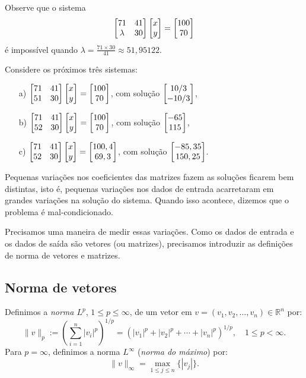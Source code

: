 \begin{ex} Observe que o sistema
\begin{equation}
\begin{bmatrix} 71&41\\\lambda&30 \end{bmatrix}\begin{bmatrix} x \\y \end{bmatrix}=\begin{bmatrix} 100 \\70 \end{bmatrix}
\end{equation}
é impossível quando $\lambda= \frac{71\times 30}{41}\approx 51,95122$.

Considere os próximos três sistemas:
\begin{enumerate}
 \item [a)] $\begin{bmatrix} 71&41\\51&30 \end{bmatrix}\begin{bmatrix} x \\y \end{bmatrix}=\begin{bmatrix} 100 \\70 \end{bmatrix}$, com solução $\begin{bmatrix} 10/3 \\-10/3 \end{bmatrix}$,
 \item [b)] $\begin{bmatrix} 71&41\\52&30 \end{bmatrix}\begin{bmatrix} x \\y \end{bmatrix}=\begin{bmatrix} 100 \\70 \end{bmatrix}$, com solução $\begin{bmatrix} -65 \\115 \end{bmatrix}$,
 \item [c)] $\begin{bmatrix} 71&41\\52&30 \end{bmatrix}\begin{bmatrix} x \\y \end{bmatrix}=\begin{bmatrix} 100,4 \\69,3 \end{bmatrix}$, com solução $\begin{bmatrix} -85,35 \\150,25 \end{bmatrix}$.
\end{enumerate}

Pequenas variações nos coeficientes das matrizes fazem as soluções ficarem bem distintas, isto é, pequenas variações nos dados de entrada acarretaram em grandes variações na solução do sistema. Quando isso acontece, dizemos que o problema é mal-condicionado.
\end{ex}

Precisamos uma maneira de medir essas variações. Como os dados de entrada e os dados de saída são vetores (ou matrizes), precisamos introduzir as definições de norma de vetores e matrizes.

\subsection{Norma de vetores}

Definimos a \emph{norma $L^p$}, $1 \leq p \leq \infty$, de um vetor em $v = (v_1, v_2, \ldots, v_n)\in \mathbb{R}^n$ por:
\begin{equation*}
  \|v\|_p := \left(\sum_{i=1}^n |v_i|^p\right)^{1/p} = \left(|v_1|^p+|v_2|^p+ \cdots + |v_n|^p\right)^{1/p},\quad 1\leq p < \infty.
\end{equation*}
Para $p=\infty$, definimos a norma $L^{\infty}$ (\emph{norma do máximo}) por:
\begin{equation*}
  \|v\|_\infty = \max_{1\leq j\leq n} \{|v_j|\}.
\end{equation*}

